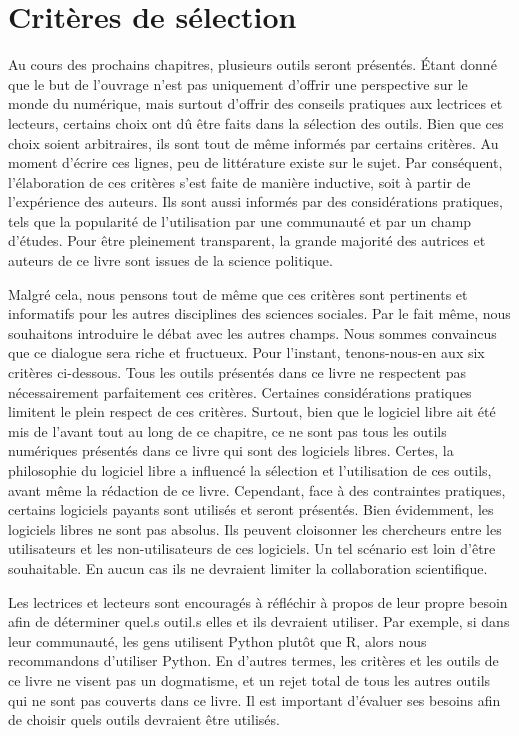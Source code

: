 \documentclass[
  letterpaper,
  DIV=11,
  numbers=noendperiod]{scrreprt}
\begin{document}
\hypertarget{crituxe8res-de-suxe9lection}{%
\section{Critères de sélection}\label{crituxe8res-de-suxe9lection}}

Au cours des prochains chapitres, plusieurs outils seront présentés.
Étant donné que le but de l'ouvrage n'est pas uniquement d'offrir une
perspective sur le monde du numérique, mais surtout d'offrir des
conseils pratiques aux lectrices et lecteurs, certains choix ont dû être
faits dans la sélection des outils. Bien que ces choix soient
arbitraires, ils sont tout de même informés par certains critères. Au
moment d'écrire ces lignes, peu de littérature existe sur le sujet. Par
conséquent, l'élaboration de ces critères s'est faite de manière
inductive, soit à partir de l'expérience des auteurs. Ils sont aussi
informés par des considérations pratiques, tels que la popularité de
l'utilisation par une communauté et par un champ d'études. Pour être
pleinement transparent, la grande majorité des autrices et auteurs de ce
livre sont issues de la science politique.

Malgré cela, nous pensons tout de même que ces critères sont pertinents
et informatifs pour les autres disciplines des sciences sociales. Par le
fait même, nous souhaitons introduire le débat avec les autres champs.
Nous sommes convaincus que ce dialogue sera riche et fructueux. Pour
l'instant, tenons-nous-en aux six critères ci-dessous. Tous les outils
présentés dans ce livre ne respectent pas nécessairement parfaitement
ces critères. Certaines considérations pratiques limitent le plein
respect de ces critères. Surtout, bien que le logiciel libre ait été mis
de l'avant tout au long de ce chapitre, ce ne sont pas tous les outils
numériques présentés dans ce livre qui sont des logiciels libres.
Certes, la philosophie du logiciel libre a influencé la sélection et
l'utilisation de ces outils, avant même la rédaction de ce livre.
Cependant, face à des contraintes pratiques, certains logiciels payants
sont utilisés et seront présentés. Bien évidemment, les logiciels libres
ne sont pas absolus. Ils peuvent cloisonner les chercheurs entre les
utilisateurs et les non-utilisateurs de ces logiciels. Un tel scénario
est loin d'être souhaitable. En aucun cas ils ne devraient limiter la
collaboration scientifique.

Les lectrices et lecteurs sont encouragés à réfléchir à propos de leur
propre besoin afin de déterminer quel.s outil.s elles et ils devraient
utiliser. Par exemple, si dans leur communauté, les gens utilisent
Python plutôt que R, alors nous recommandons d'utiliser Python. En
d'autres termes, les critères et les outils de ce livre ne visent pas un
dogmatisme, et un rejet total de tous les autres outils qui ne sont pas
couverts dans ce livre. Il est important d'évaluer ses besoins afin de
choisir quels outils devraient être utilisés.
\end{document}

